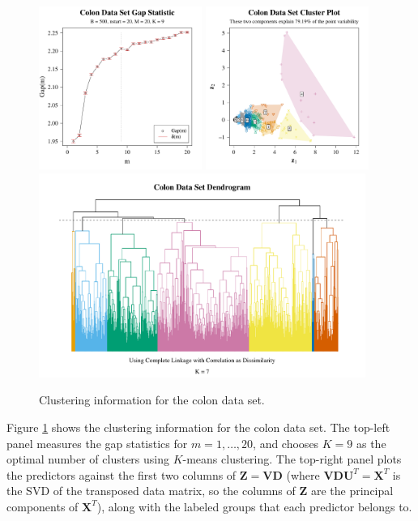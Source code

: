 \documentclass[11pt]{article}
\begin{document}
\begin{figure}[ht]
    \centering
    \includegraphics[width = 0.475\textwidth]{colon_gap_stat.pdf}
    \includegraphics[width = 0.475\textwidth]{colon_clus_plot.pdf}
    \includegraphics[width = 0.95\textwidth]{colon_den.pdf}
    \caption{Clustering information for the colon data set.}
    \label{colonclus}
\end{figure}

Figure \ref{colonclus} shows the clustering information for the colon data set. The top-left panel measures the gap statistics for $m = 1, \ldots, 20$, and chooses $K = 9$ as the optimal number of clusters using $K$-means clustering. The top-right panel plots the predictors against the first two columns of $\mathbf{Z} = \mathbf{V} \mathbf{D}$ (where $\mathbf{V} \mathbf{D} \mathbf{U}^T = \mathbf{X}^T$ is the SVD of the transposed data matrix, so the columns of $\mathbf{Z}$ are the principal components of $\mathbf{X}^T$), along with the labeled groups that each predictor belongs to. 
\end{document}
